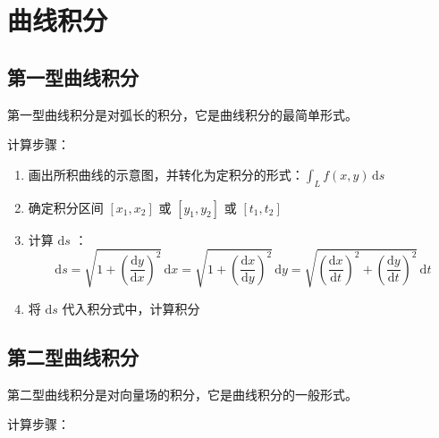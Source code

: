 \chapter{曲线积分}

\section{第一型曲线积分}

第一型曲线积分是对弧长的积分，它是曲线积分的最简单形式。

计算步骤：

\begin{enumerate}
    \item 画出所积曲线的示意图，并转化为定积分的形式：$\int_{L} f(x,y) \, \mathrm{d}s$
    \item 确定积分区间 $[x_1,x_2]$ 或 $[y_1,y_2]$ 或 $[t_1,t_2]$
    \item 计算 $\mathrm{d}s$ ：
          \[
              \mathrm{d}s = \sqrt{1+(\frac{\mathrm{d}y}{\mathrm{d}x})^2} \, \mathrm{d}x = \sqrt{1+(\frac{\mathrm{d}x}{\mathrm{d}y})^2} \, \mathrm{d}y = \sqrt{(\frac{\mathrm{d}x}{\mathrm{d}t})^2+(\frac{\mathrm{d}y}{\mathrm{d}t})^2} \, \mathrm{d}t
          \]
    \item 将 $\mathrm{d}s$ 代入积分式中，计算积分
\end{enumerate}



\section{第二型曲线积分}

第二型曲线积分是对向量场的积分，它是曲线积分的一般形式。

计算步骤：


